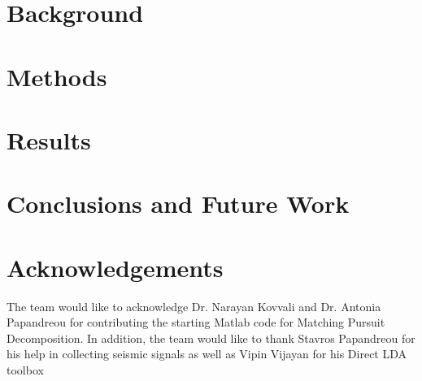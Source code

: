 \documentclass{article}[11pt]
\begin{document}
\section{Background}
\label{sec:background}



\section{Methods}
\label{sec:methods}


\section{Results}
\label{sec:results}

 

\section{Conclusions and Future Work}
\label{sec:conclusion}


\section{Acknowledgements}
\label{sec:Ack}
The team would like to acknowledge Dr. Narayan Kovvali and Dr. Antonia Papandreou for contributing the starting Matlab code for Matching Pursuit Decomposition.  In addition, the team would like to thank Stavros Papandreou for his help in collecting seismic signals as well as Vipin Vijayan for his Direct LDA toolbox \cite{Vijayan}




\end{document}
